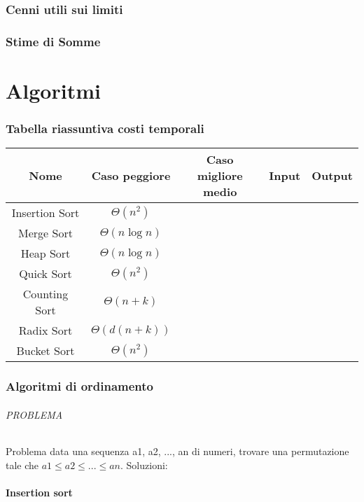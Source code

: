\documentclass{article}
\begin{document}
\section{Cenni utili sui limiti}

\section{Stime di Somme}

\part{Algoritmi}
\section{Tabella riassuntiva costi temporali} %
\begin{tabular}{|c|c|c|c|c|}
    \hline
    \textbf{Nome} & \textbf{Caso peggiore} & \textbf{Caso migliore\\medio} & \textbf{Input} & \textbf{Output}\\
    \hline
    Insertion Sort & $\Theta(n^2)$ & & \\
    Merge Sort & $\Theta(n \log n)$ \\
    Heap Sort & $\Theta(n \log n)$ \\
    Quick Sort & $\Theta(n^2)$ \\
    Counting Sort & $\Theta(n+k)$ \\
    Radix Sort & $\Theta(d(n+k))$ \\
    Bucket Sort & $\Theta(n^2)$ \\
    \hline
\end{tabular}

\section{Algoritmi di ordinamento}
\paragraph{PROBLEMA} Problema data una sequenza a1, a2, ..., an di numeri, trovare una permutazione tale che 
$a1 \leq a2  \leq ... \leq an$. \newline
Soluzioni:
\subsection{Insertion sort}  %
\end{document}
